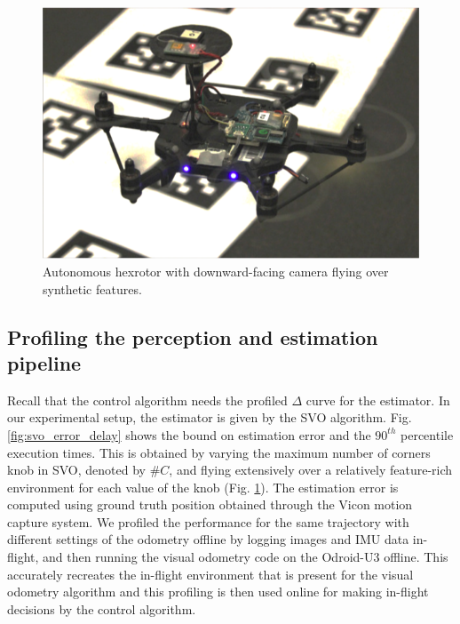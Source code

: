 

\begin{figure}[t]
	\centering
	\includegraphics[width=0.7\linewidth]{figures/nanohex2}
	\caption{Autonomous hexrotor with downward-facing camera flying over synthetic features.}
	\label{fig:nanohex}
	\vspace{-10pt}
\end{figure}


\subsection{Profiling the perception and estimation pipeline}
\label{sec:Profiling_SVO}



Recall that the control algorithm needs the profiled $\Delta$ curve for the estimator. 
In our experimental setup, the estimator is given by the SVO algorithm. 
Fig. \ref{fig:svo_error_delay} shows the bound on estimation error and the $90^{th}$ percentile execution times.
This is obtained by varying the maximum number of corners knob in SVO, denoted by $\#C$, and flying extensively over a relatively feature-rich environment for each value of the knob (Fig. \ref{fig:nanohex}). 
The estimation error is computed using ground truth position obtained through the Vicon motion capture system. 
We profiled the performance for the same trajectory with different settings of the odometry offline by logging images and IMU data in-flight, and then running the visual odometry code on the Odroid-U3 offline.
This accurately recreates the in-flight environment that is present for the visual odometry algorithm and this profiling is then used online for making in-flight decisions by the control algorithm.


